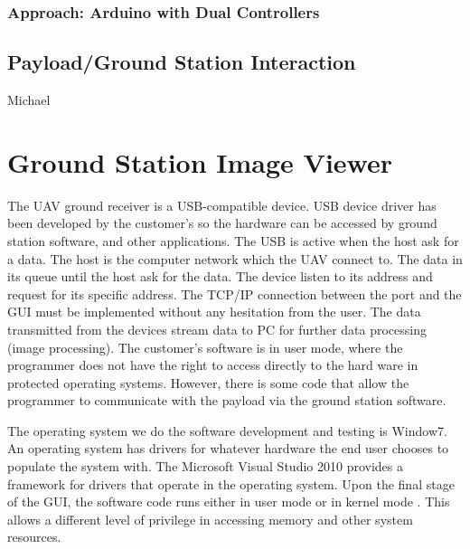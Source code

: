 \documentclass[oneside]{ecsgdp}         %
\begin{document}
\subsubsection{Approach: Arduino with Dual Controllers}



\subsection{Payload/Ground Station Interaction}
Michael


\section{Ground Station Image Viewer}
The UAV ground receiver is a USB-compatible device. USB device driver has been developed by the customer’s so the hardware can be accessed by ground station software, and other applications. The USB is active when the host ask for a data. The host is the computer network which the UAV connect to. The data in its queue until the host ask for the data. The device listen to its address and request for its specific address. The TCP/IP connection between the port and the GUI must be implemented without any hesitation from the user. The data transmitted from the devices stream data to PC for further data processing (image processing).  The customer’s software is in user mode, where the programmer does not have the right to access directly to the hard ware in protected operating systems. However, there is some code that allow the programmer to communicate with the payload via the ground station software.

The operating system we do the software development and testing is Window7. An operating system has drivers for whatever hardware the end user chooses to populate the system with. The Microsoft Visual Studio 2010 provides a framework for drivers that operate in the operating system. Upon the final stage of the GUI, the software code runs either in user mode or in kernel mode \cite{tsuiK}. This allows a different level of privilege in accessing memory and other system resources. 
\end{document}
